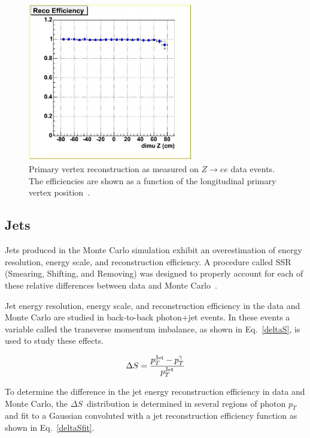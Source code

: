 \begin{figure}[!h!tbp]
\begin{center}
\includegraphics[width=0.65\textwidth]{eps/Reco/PV_Reco.eps}
\end{center}
\vspace{-0.1in}
\caption{Primary vertex reconstruction as measured on $Z \rightarrow ee$ data events. The efficiencies are shown as a function of the longitudinal primary vertex position~\cite{pv}.}
\label{pveff}
\end{figure}

\subsection{Jets}

Jets produced in the Monte Carlo simulation exhibit an overestimation of energy resolution, energy scale, and reconstruction efficiency. A procedure called SSR (Smearing, Shifting, and Removing) was designed to properly account for each of these relative differences between data and Monte Carlo~\cite{ssr}.

Jet energy resolution, energy scale, and reconstruction efficiency in the data and Monte Carlo are studied in back-to-back photon+jet events. In these events a variable called the transverse momentum imbalance, as shown in Eq.~\ref{deltaS}, is used to study these effects.

\begin{equation}
\label{deltaS}
\Delta S = \frac{p_{T}^{\rm{Jet}} - p_{T}^{\rm{\gamma}}}{p_{T}^{\rm{Jet}}}
\end{equation}

To determine the difference in the jet energy reconstruction efficiency in data and Monte Carlo, the $\Delta S$~distribution is determined in several regions of photon $p_{T}$ and fit to a Gaussian convoluted with a jet reconstruction efficiency function as shown in Eq.~\ref{deltaSfit}.

